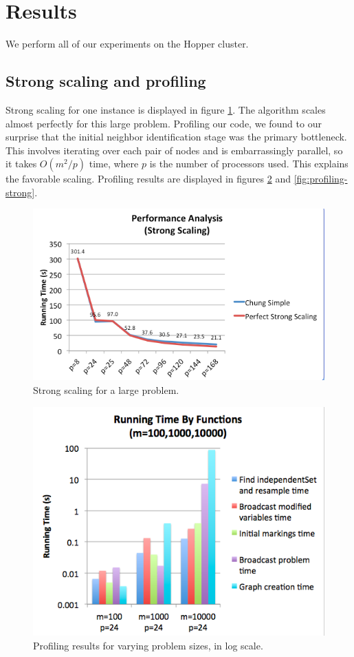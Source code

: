 \documentclass[twocolumn]{article}
\begin{document}
\section{Results}
\label{sec:scaling}
We perform all of our experiments on the Hopper cluster.

\subsection{Strong scaling and profiling}
Strong scaling for one instance is displayed in figure \ref{fig:strong}.  The algorithm scales almost perfectly for this large problem.  Profiling our code, we found to our surprise that the initial neighbor identification stage was the primary bottleneck.  This involves iterating over each pair of nodes and is embarrassingly parallel, so it takes $O(m^2/p)$ time, where $p$ is the number of processors used.  This explains the favorable scaling.  Profiling results are displayed in figures \ref{fig:profiling} and \ref{fig:profiling-strong}.

\begin{figure}[ht]
  \includegraphics[scale=0.4]{figures/strong.png}
  \caption{Strong scaling for a large problem.}
  \label{fig:strong}
\end{figure}

\begin{figure}[ht]
  \includegraphics[scale=0.4]{figures/profiling.png}
  \caption{Profiling results for varying problem sizes, in log scale.}
  \label{fig:profiling}
\end{figure}
\end{document}
